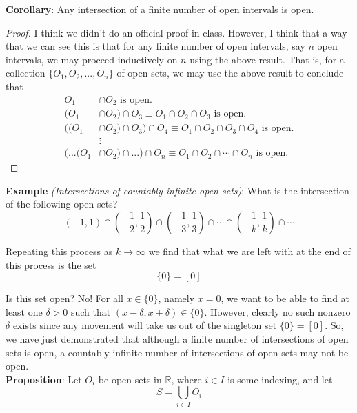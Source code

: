 \documentclass[12pt]{article}
\newlength\tindent
\renewcommand{\indent}{\hspace*{\tindent}}
\newcommand{\R}{\mathbb R}
\begin{document}
%
%
{\bf Corollary}: Any intersection of a finite number of open intervals is open.

\begin{proof} I think we didn't do an official proof in class. However, I think that a way that we can see this is that for any finite number of open intervals, say $n$ open intervals, we may proceed inductively on $n$ using the above result. That is, for a collection $\{O_1, O_2, ..., O_n\}$ of open sets, we may use the above result to conclude that
\begin{align*}
	O_1 &\cap O_2 \text{ is open.} \\
	(O_1 &\cap O_2) \cap O_3 \equiv O_1 \cap O_2 \cap O_3 \text{ is open.} \\
	((O_1 &\cap O_2) \cap O_3) \cap O_4 \equiv O_1 \cap O_2 \cap O_3 \cap O_4 \text{ is open.} \\
	&\vdots \\
	(...(O_1 &\cap O_2) \cap ... ) \cap O_n \equiv O_1 \cap O_2 \cap \cdots \cap O_n \text{ is open.}
\end{align*}
\end{proof}

{\bf Example} {\em (Intersections of countably infinite open sets)}: What is the intersection of the following open sets?
\begin{equation*}
	(-1, 1) \cap \left(-\frac{1}{2}, \frac{1}{2}\right) \cap \left(-\frac{1}{3}, \frac{1}{3}\right) \cap \cdots \cap \left(-\frac{1}{k}, \frac{1}{k}\right) \cap \cdots
\end{equation*}

Repeating this process as $k \to \infty$ we find that what we are left with at the end of this process is the set
\begin{equation*}
	\{0\} = [0]
\end{equation*}

\indent Is this set open? No! For all $x \in \{0\}$, namely $x = 0$, we want to be able to find at least one $\delta > 0$ such that $(x - \delta, x + \delta) \in \{0\}$. However, clearly no such nonzero $\delta$ exists since any movement will take us out of the singleton set $\{0\} = [0]$. So, we have just demonstrated that although a finite number of intersections of open sets is open, a countably infinite number of intersections of open sets may not be open. \\

%
%
{\bf Proposition}: Let $O_i$ be open sets in $\R$, where $i \in I$ is some indexing, and let
\begin{equation*}
	S = \bigcup_{i \in I} O_i
\end{equation*}
\end{document}

